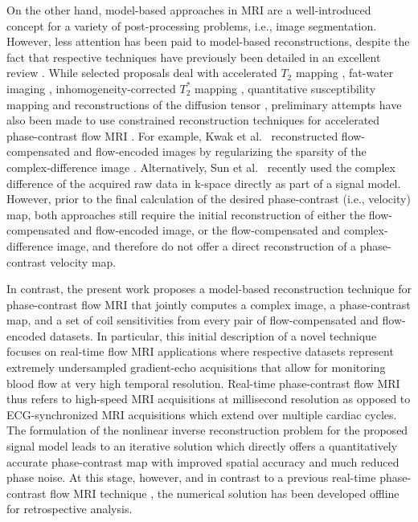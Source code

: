 On the other hand, model-based approaches in MRI are a well-introduced concept for a variety of post-processing problems, i.e., image segmentation. However, less attention has been paid to model-based reconstructions, despite the fact that respective techniques have previously been detailed in an excellent review \cite{2010_MIR_Fessler}. While selected proposals deal with accelerated $T_2$ mapping \cite{2009_MIR-T2_Block,2011_T2_Sumpf,2014_T2_Sumpf}, fat-water imaging \cite{2004_IDEAL}, inhomogeneity-corrected $T_2^*$ mapping \cite{2009_fim_t2s_me_TMI}, quantitative susceptibility mapping \cite{2013_nlinv_QSM_MRM} and reconstructions of the diffusion tensor \cite{2015_mb_DTI_NBM}, preliminary attempts have also been made to use constrained reconstruction techniques for accelerated phase-contrast flow MRI \cite{2013_PC_CD_Kwak,2015_CD_Sun}. For example, Kwak et al.~\cite{2013_PC_CD_Kwak} reconstructed flow-compensated and flow-encoded images by regularizing the sparsity of the complex-difference image \cite{2004_MRI_Bernstein}.  Alternatively, Sun et al.~\cite{2015_CD_Sun} recently used the complex difference of the acquired raw data in k-space directly as part of a signal model. However, prior to the final calculation of the desired phase-contrast (i.e., velocity) map, both approaches still require the initial reconstruction of either the flow-compensated and flow-encoded image, or the flow-compensated and complex-difference image, and therefore do not offer a direct reconstruction of a phase-contrast velocity map.

In contrast, the present work proposes a model-based reconstruction technique for phase-contrast flow MRI that jointly computes a complex image, a phase-contrast map, and a set of coil sensitivities from every pair of flow-compensated and flow-encoded datasets. In particular, this initial description of a novel technique focuses on real-time flow MRI applications where respective datasets represent extremely undersampled gradient-echo acquisitions \cite{2015_PC_Asym} that allow for monitoring blood flow at very high temporal resolution. Real-time phase-contrast flow MRI thus refers to high-speed MRI acquisitions at millisecond resolution as opposed to ECG-synchronized MRI acquisitions which extend over multiple cardiac cycles. The formulation of the nonlinear inverse reconstruction problem for the proposed signal model leads to an iterative solution which directly offers a quantitatively accurate phase-contrast map with improved spatial accuracy and much reduced phase noise. At this stage, however, and in contrast to a previous real-time phase-contrast flow MRI technique \cite{2015_PC_Asym}, the numerical solution has been developed offline for retrospective analysis.


